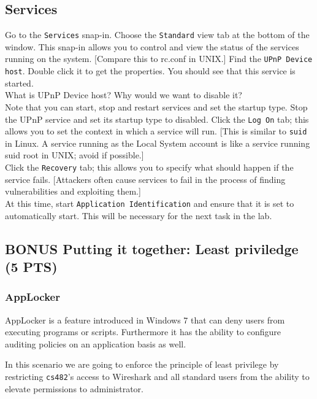 \documentclass{article}
\begin{document}
\subsection{Services}

Go to the {\tt Services} snap-in. Choose the {\tt Standard} view tab at the bottom of the window. This snap-in allows you to control and view the status of the services running on the system. [Compare this to rc.conf in UNIX.]
Find the {\tt UPnP Device host}. Double click it to get the properties. You should see that this service is started. \\

\question What is UPnP Device host? Why would we want to disable it?\\

Note that you can start, stop and restart services and set the startup type. Stop the UPnP service and set its startup type to disabled. Click the {\tt Log On} tab; this allows you to set the context in which a service will run.  [This is similar to {\tt suid} in Linux\Unix.  A service running as the Local System account is like a service running suid root in UNIX; avoid if possible.] \\
Click the {\tt Recovery} tab; this allows you to specify what should happen if the service fails. [Attackers often cause services to fail in the process of finding vulnerabilities and exploiting them.]\\
At this time, start {\tt Application Identification} and ensure that it is set to automatically start.  This will be necessary for the next task in the lab. 

\subsection{BONUS Putting it together: Least priviledge (5 PTS)}

\subsubsection{AppLocker}

AppLocker is a feature introduced in Windows 7 that can deny users from executing programs or scripts.  Furthermore it has the ability to configure auditing policies on an application basis as well.  

In this scenario we are going to enforce the principle of least privilege by restricting {\tt cs482}'s access to Wireshark and all standard users from the ability to elevate permissions to administrator.
\end{document}
